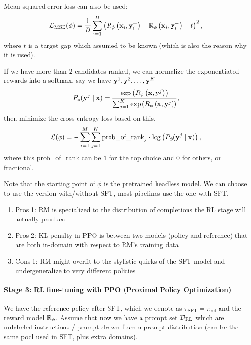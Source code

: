 \documentclass[11pt]{article}  %
\begin{document}
Mean-squared error loss can also be used:
\begin{align*}
  \mathcal{L}_{\text{MSE}}(\phi) = \frac{1}{B}\sum_{i=1}^{B}\left( R_{\phi}\left( \mathbf{x}_i, \mathbf{y}_i^+ \right) - \mathbb{R}_\phi\left( \mathbf{x}_i, \mathbf{y}_i^- \right) - t \right)^2,
\end{align*}
where $t$ is a target gap which assumed to be known (which is also the reason why it is used).

If we have more than $2$ candidates ranked, we can normalize the exponentiated rewards into a softmax, say we have $\mathbf{y}^1, \mathbf{y}^2, \hdots, \mathbf{y}^K$ 
\begin{align*}
  P_{\phi}(\mathbf{y}^j \mid \mathbf{x}) = \frac{\exp\left( R_{\phi}\left( \mathbf{x}, \mathbf{y}^j \right) \right)}{\sum_{j=1}^{K}\exp\left( R_{\phi}\left( \mathbf{x}, \mathbf{y}^j \right) \right)},
\end{align*}
then minimize the cross entropy loss based on this,
\begin{align*}
  \mathcal{L} (\phi) = - \sum_{i=1}^M\sum_{j=1}^{K} \text{prob\_of\_rank}_j \cdot \log \left( P_{\phi}(\mathbf{y}^j \mid \mathbf{x}) \right), 
\end{align*}
where this prob\_of\_rank can be $1$ for the top choice and $0$ for others, or fractional.

Note that the starting point of $\phi$ is the pretrained headless model.
We can choose to use the version with/without SFT, most pipelines use the one with SFT.
\begin{enumerate}
  \item Pros 1: RM is specialized to the distribution of completions the RL stage will actually produce
  \item Pros 2: KL penalty in PPO is between two models (policy and reference) that are both in-domain with respect to RM's training data
  \item Cons 1: RM might overfit to the stylistic quirks of the SFT model and undergeneralize to very different policies
\end{enumerate}



\paragraph{Stage 3: RL fine-tuning with PPO (Proximal Policy Optimization)} 
We have the reference policy after SFT, which we denote as $\pi_{\text{SFT}} = \pi_{\text{ref}}$ and the reward model $\mathbb{R}_{\phi}$.
Assume that now we have a prompt set $\mathcal{D}_{\text{RL}}$ which are unlabeled instructions / prompt drawn from a prompt distribution (can be the same pool used in SFT, plus extra domains).
\end{document}
